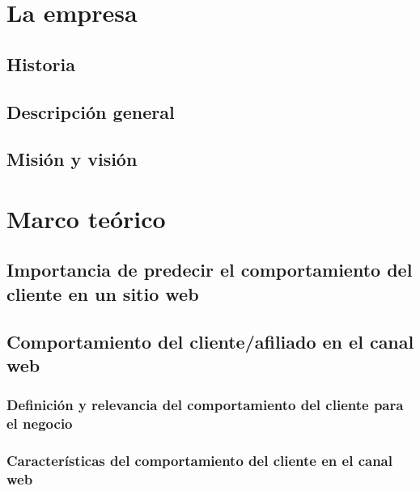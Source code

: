 \documentclass{report}
\begin{document}
\chapter{La empresa}

\section{Historia}


\section{Descripción general}


\section{Misión y visión}


\chapter{Marco teórico}

\section{Importancia de predecir el comportamiento del cliente en un sitio web}


\section{Comportamiento del cliente/afiliado en el canal web}
\subsection{Definición y relevancia del comportamiento del cliente para el negocio}


\subsection{Características del comportamiento del cliente en el canal web}

\end{document}
